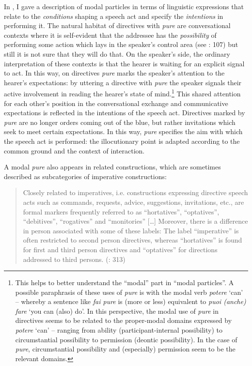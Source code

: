 In , I gave a description of modal particles in terms of linguistic expressions that relate to the \textit{conditions} shaping a speech act and specify the \textit{intentions} in performing it. The natural habitat of directives with \textit{pure} are conversational contexts where it is self-evident that the addressee has the \textit{possibility} of performing some action which lays in the speaker’s control area (see \citealt{Waltereit2006}: 107) but still it is not sure that they will do that. On the speaker’s side, the ordinary interpretation of these contexts is that the hearer is waiting for an explicit signal to act. In this way, on directives \textit{pure} marks the speaker’s attention to the hearer’s expectations: by uttering a directive with \textit{pure} the speaker signals their active involvement in reading the hearer’s state of mind.\footnote{This helps to better understand the “modal” part in “modal particles”. A possible paraphrasis of these uses of \textit{pure} is with the modal verb \textit{potere} ‘can’ – whereby a sentence like \textit{fai pure} is (more or less) equivalent to \textit{puoi (anche) fare} ‘you can (also) do’. In this perspective, the modal use of \textit{pure} in directives seems to be related to the proper-modal domains expressed by \textit{potere} ‘can’ – ranging from ability (participant-internal possibility) to circumstantial possibility to permission (deontic possibility). In the case of \textit{pure}, circumstantial possibility and (especially) permission seem to be the relevant domains.} This shared attention for each other’s position in the conversational exchange and communicative expectations is reflected in the intentions of the speech act. Directives marked by \textit{pure} are no longer orders coming out of the blue, but rather invitations which seek to meet certain expectations. In this way, \textit{pure} specifies the aim with which the speech act is performed: the illocutionary point is adapted according to the common ground and the context of interaction.

A modal \textit{pure} also appears in related constructions, which are sometimes described as subcategories of imperative constructions:

\begin{quote}
Closely related to imperatives, i.e. constructions expressing directive speech acts such as commands, requests, advice, suggestions, invitations, etc., are formal markers frequently referred to as “hortatives”, “optatives”, “debitives”, “rogatives” and “monitories” […] Moreover, there is a difference in person associated with some of these labels: The label “imperative” is often restricted to second person directives, whereas “hortatives” is found for first and third person directives and “optatives” for directions addressed to third persons. (\citealt{KönigSiemund2007}: 313)
\end{quote}

